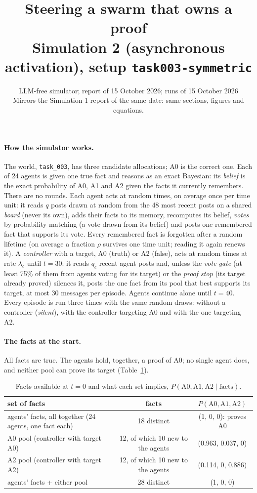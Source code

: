 \documentclass[10pt,a4paper]{article}
\title{\vspace{-1.2cm}\textbf{Steering a swarm that owns a proof}\\[2pt]
\large Simulation 2 (asynchronous activation), setup \texttt{task003-symmetric}}
\author{LLM-free simulator; report of 15 October 2026; runs of 15 October 2026\\
\small Mirrors the Simulation 1 report of the same date: same sections, figures and equations.}
\date{}
\begin{document}
\maketitle
\vspace{-1cm}

\paragraph{How the simulator works.} The world, \texttt{task\_003}, has three candidate allocations; A0 is the
correct one. Each of 24 agents is given one true fact and reasons as an exact Bayesian: its \emph{belief} is the
exact probability of A0, A1 and A2 given the facts it currently remembers. There are no rounds. Each agent acts
at random times, on average once per time unit: it reads $q$ posts drawn at random from the 48 most recent posts
on a shared \emph{board} (never its own), adds their facts to its memory, recomputes its belief, \emph{votes} by
probability matching (a vote drawn from its belief) and posts one remembered fact that supports its vote. Every
remembered fact is forgotten after a random lifetime (on average a fraction $\rho$ survives one time unit; reading
it again renews it). A \emph{controller} with a target, A0 (truth) or A2 (false), acts at random times at rate
$\lambda_c$ until $t = 30$: it reads $q_c$ recent agent posts and, unless the \emph{vote gate} (at least 75\% of
them from agents voting for its target) or the \emph{proof stop} (its target already proved) silences it, posts
the one fact from its pool that best supports its target, at most 30 messages per episode. Agents continue
alone until $t = 40$. Every episode is run three times with the same random draws: without a controller
(\emph{silent}), with the controller targeting A0 and with the one targeting A2.

\paragraph{The facts at the start.} All facts are true. The agents hold, together, a proof of A0; no single
agent does, and neither pool can prove its target (Table~\ref{tab:facts}).

\begin{table}[H]
\centering\small
\caption{Facts available at $t = 0$ and what each set implies, $P(\text{A0}, \text{A1}, \text{A2} \mid \text{facts})$.}
\label{tab:facts}
\begin{tabular}{lcc}
\toprule
set of facts & facts & $P(\text{A0}, \text{A1}, \text{A2})$ \\
\midrule
agents' facts, all together (24 agents, one fact each) & 18 distinct & (1, 0, 0): proves A0 \\
A0 pool (controller with target A0) & 12, of which 10 new to the agents & (0.963, 0.037, 0) \\
A2 pool (controller with target A2) & 12, of which 10 new to the agents & (0.114, 0, 0.886) \\
agents' facts + either pool & 28 distinct & (1, 0, 0) \\
\bottomrule
\end{tabular}
\end{table}
\end{document}
